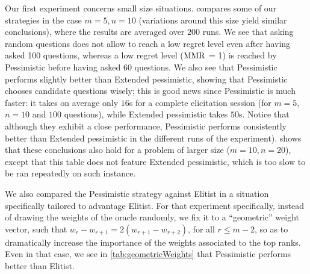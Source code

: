 \documentclass[sigconf, anonymous]{aamas}
\begin{document}
Our first experiment concerns small size situations.
 compares some of our strategies in the case $m = 5, n = 10$ (variations around this size yield similar conclusions), where the results are averaged over $200$ runs.
We see that asking random questions does not allow to reach a low regret level even after having asked 100 questions, whereas a low regret level ($\operatorname{MMR}$ = 1) is reached by Pessimistic before having asked 60 questions.
We also see that Pessimistic performs slightly better than Extended pessimistic, showing that Pessimistic chooses candidate questions wisely; this is good news since Pessimistic is much faster: it takes on average only $16$s for a complete elicitation session (for $m = 5$, $n = 10$ and $100$ questions), while Extended pessimistic takes $50$s. Notice that although they exhibit a close performance, Pessimistic performs %
consistently better than Extended pessimistic in the different runs of the experiment).
 shows that these conclusions also hold for a problem of larger size ($m = 10, n = 20$), except that this table does not feature Extended pessimistic, which is too slow to be ran repeatedly on such instance.

We also compared the Pessimistic strategy against Elitist in a situation specifically tailored to advantage Elitist. For that experiment specifically, instead of drawing the weights of the oracle randomly, we fix it to a “geometric” weight vector, such that $w_r - w_{r + 1} = 2(w_{r + 1} - w_{r + 2})$, for all $r ≤ m - 2$, so as to dramatically increase the importance of the weights associated to the top ranks. Even in that case, we see in \cref{tab:geometricWeights} that Pessimistic performs better than Elitist.

\end{document}
